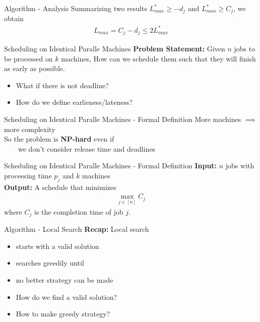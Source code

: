 \documentclass{beamer}
\newcommand*{\brk}{\\[10pt]}
\begin{document}
\begin{frame}{Algorithm - Analysis} 
    Summarizing two results $L_{max}^* \geq -d_j$ and $L_{max}^* \geq C_j$, we obtain
    \begin{align*}
        L_{max} = C_j - d_j \leq 2L_{max}^*
    \end{align*}
\end{frame} 

\begin{frame}{Scheduling on Identical Paralle Machines}
    \textbf{Problem Statement: } Given $n$ jobs to be processed on $k$ 
    machines, How can we schedule them such that they will finish as early as possible. \brk 
    \begin{itemize}
        \item What if there is not deadline?
        \item How do we define earlieness/lateness?
    \end{itemize}
\end{frame}

\begin{frame}{Scheduling on Identical Paralle Machines - Formal Definition}
    More machines $\implies$ more complexity \brk 
    So the problem is \textbf{NP-hard} even if \brk 
    \ \ \ \ we don't consider \color{red} release time \color{black} and \color{red} deadlines \color{black}
\end{frame}

\begin{frame}{Scheduling on Identical Paralle Machines - Formal Definition}
    \textbf{Input:} $n$ jobs with processing time $p_j$ and $k$ machines \brk 
    \textbf{Output:} A schedule that minimizes 
    \begin{align*}
        \max_{j \in [n]} C_j 
    \end{align*}
    where $C_j$ is the completion time of job $j$.
\end{frame}

\begin{frame}{Algorithm - Local Search}
    \textbf{Recap:} Local search 
    \begin{itemize}
        \item<1-3> starts with a valid solution 
        \item<2-3> searches greedily until 
        \item<3> no better strategy can be made 
        \item<4> How do we find a valid solution?
        \item<4> How to make greedy strategy?
    \end{itemize}
\end{frame}
\end{document}
